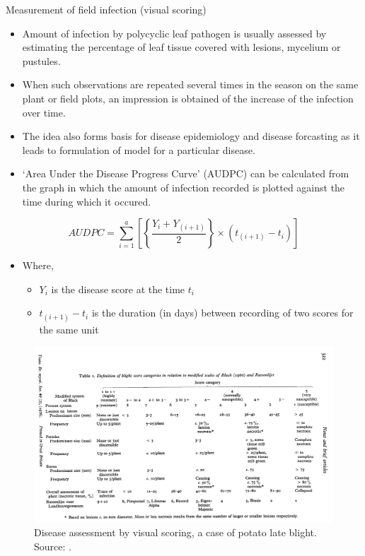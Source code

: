\documentclass[11pt,dvipsnames,ignorenonframetext,aspectratio=169]{beamer}
\providecommand{\tightlist}{%
  \setlength{\itemsep}{0pt}\setlength{\parskip}{0pt}}
\begin{document}
\begin{frame}{Measurement of field infection (visual scoring)}
\protect\hypertarget{measurement-of-field-infection-visual-scoring}{}
\footnotesize

\begin{itemize}
\tightlist
\item
  Amount of infection by polycyclic leaf pathogen is usually assessed by
  estimating the percentage of leaf tissue covered with lesions,
  mycelium or pustules.
\item
  When such observations are repeated several times in the season on the
  same plant or field plots, an impression is obtained of the increase
  of the infection over time.
\item
  The idea also forms basis for disease epidemiology and disease
  forcasting as it leads to formulation of model for a particular
  disease.
\item
  `Area Under the Disease Progress Curve' (AUDPC) can be calculated from
  the graph in which the amount of infection recorded is plotted against
  the time during which it occured.
\end{itemize}

\begin{equation}
AUDPC = \sum_{i = 1}^a \left [\left\{ \frac{Y_i + Y_{(i+1)}}{2}\right\} \times (t_{(i+1)}-t_i)\right ]
\end{equation}

\begin{itemize}
\tightlist
\item
  Where,

  \begin{itemize}
  \footnotesize
  \item $Y_i$ is the disease score at the time $t_i$
  \item $t_{(i+1)}-t_i$ is the duration (in days) between recording of two scores for the same unit
  \end{itemize}
\end{itemize}
\end{frame}

\begin{frame}{}
\protect\hypertarget{section-5}{}
\begin{figure}
\includegraphics[width=0.8\linewidth]{../images/phytophthora_infestans_infection_assessment} \caption{Disease assessment by visual scoring, a case of potato late blight. Source: \cite{malcolmson1976assessment}.}\label{fig:phytophthora-infection-assessment}
\end{figure}
\end{frame}
\end{document}
